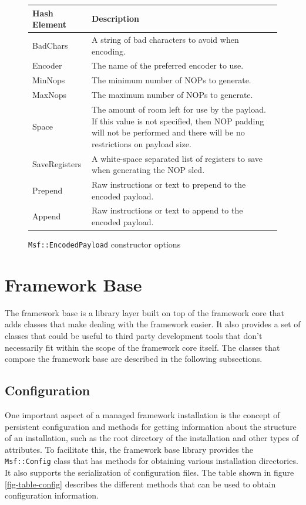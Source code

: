 \documentclass{report}
\begin{document}
\begin{figure}[h]
\begin{center}
\begin{tabular}{|l|p{3.5in}|}
\hline
\textbf{Hash Element} & \textbf{Description} \\
\hline
BadChars & A string of bad characters to avoid when encoding. \\
\hline
Encoder & The name of the preferred encoder to use. \\
\hline
MinNops & The minimum number of NOPs to generate. \\
\hline
MaxNops & The maximum number of NOPs to generate. \\
\hline
Space & The amount of room left for use by the payload.  If this value is not specified, then NOP padding will not be performed and there will be no restrictions on payload size. \\
\hline
SaveRegisters & A white-space separated list of registers to save when generating the NOP sled. \\
\hline
Prepend & Raw instructions or text to prepend to the encoded payload. \\
\hline
Append & Raw instructions or text to append to the encoded payload. \\
\hline
\end{tabular}
\caption{\texttt{Msf::EncodedPayload} constructor options}
\label{fig-table-enc-payload-options}
\end{center}
\end{figure}

\chapter{Framework Base}

\par
The framework base is a library layer built on top of the framework
core that adds classes that make dealing with the framework easier.
It also provides a set of classes that could be useful to third
party development tools that don't necessarily fit within the scope
of the framework core itself.  The classes that compose the
framework base are described in the following subsections.

    \section{Configuration}

\par
One important aspect of a managed framework installation is the
concept of persistent configuration and methods for getting
information about the structure of an installation, such as the root
directory of the installation and other types of attributes.  To
facilitate this, the framework base library provides the
\texttt{Msf::Config} class that has methods for obtaining various
installation directories.  It also supports the serialization of
configuration files.  The table shown in figure
\ref{fig-table-config} describes the different methods that can be
used to obtain configuration information.
\end{document}
